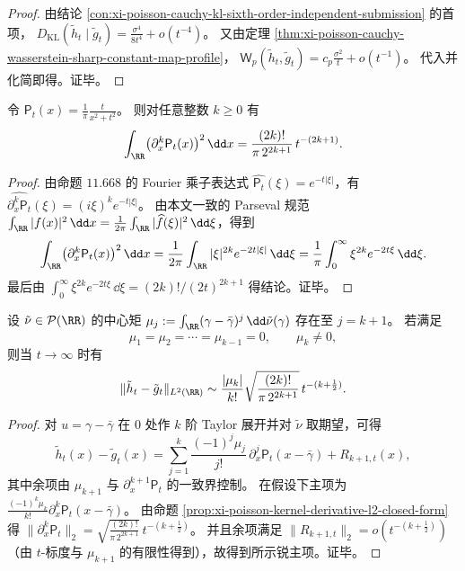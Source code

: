 \begin{proof}
由结论 \ref{con:xi-poisson-cauchy-kl-sixth-order-independent-submission} 的首项，
\(
D_{\mathrm{KL}}(\tilde h_t\mid \tilde g_t)=\frac{\sigma^4}{8t^4}+o(t^{-4})
\)。
又由定理 \ref{thm:xi-poisson-cauchy-wasserstein-sharp-constant-map-profile}，
\(
\mathsf W_p(\tilde h_t,\tilde g_t)=c_p\frac{\sigma^2}{t}+o(t^{-1})
\)。
代入并化简即得。证毕。
\end{proof}

\begin{proposition}\label{prop:xi-poisson-kernel-derivative-l2-closed-form}
令 \(\mathsf P_t(x)=\frac1\pi\frac{t}{x^2+t^2}\)。
则对任意整数 \(k\ge 0\) 有
\[
\int_{\RR}\bigl(\partial_x^k \mathsf P_t(x)\bigr)^2\,\dd x
=\frac{(2k)!}{\pi\,2^{2k+1}}\,t^{-(2k+1)}.
\]
\end{proposition}

\begin{proof}
由命题 \(11.668\) 的 Fourier 乘子表达式 \(\widehat{\mathsf P_t}(\xi)=e^{-t|\xi|}\)，有
\(
\widehat{\partial_x^k\mathsf P_t}(\xi)=(i\xi)^k e^{-t|\xi|}
\)。
由本文一致的 Parseval 规范
\(
\int_{\RR}|f(x)|^2\,\dd x=\frac{1}{2\pi}\int_{\RR}|\widehat f(\xi)|^2\,\dd\xi
\)，得到
\[
\int_{\RR}\bigl(\partial_x^k \mathsf P_t(x)\bigr)^2\,\dd x
=\frac{1}{2\pi}\int_{\RR}|\xi|^{2k}e^{-2t|\xi|}\,\dd\xi
=\frac{1}{\pi}\int_0^\infty \xi^{2k}e^{-2t\xi}\,\dd\xi.
\]
最后由 \(\int_0^\infty \xi^{2k}e^{-2t\xi}\,\dd\xi=(2k)!/(2t)^{2k+1}\) 得结论。证毕。
\end{proof}

\begin{theorem}\label{thm:xi-poisson-cauchy-multipole-l2-leading-term}
设 \(\tilde\nu\in\mathcal P(\RR)\) 的中心矩 \(\mu_j:=\int_{\RR}(\gamma-\bar\gamma)^j\,\dd\tilde\nu(\gamma)\) 存在至 \(j=k+1\)。
若满足
\[
\mu_1=\mu_2=\cdots=\mu_{k-1}=0,
\qquad
\mu_k\neq 0,
\]
则当 \(t\to\infty\) 时有
\[
\|\tilde h_t-\tilde g_t\|_{L^2(\RR)}
\sim
\frac{|\mu_k|}{k!}\sqrt{\frac{(2k)!}{\pi\,2^{2k+1}}}\,t^{-(k+\frac12)}.
\]
\end{theorem}

\begin{proof}
对 \(u=\gamma-\bar\gamma\) 在 \(0\) 处作 \(k\) 阶 Taylor 展开并对 \(\tilde\nu\) 取期望，可得
\[
\tilde h_t(x)-\tilde g_t(x)
=\sum_{j=1}^{k}\frac{(-1)^j\mu_j}{j!}\,\partial_x^j\mathsf P_t(x-\bar\gamma)+R_{k+1,t}(x),
\]
其中余项由 \(\mu_{k+1}\) 与 \(\partial_x^{k+1}\mathsf P_t\) 的一致界控制。
在假设下主项为 \(\frac{(-1)^k\mu_k}{k!}\partial_x^k\mathsf P_t(x-\bar\gamma)\)。
由命题 \ref{prop:xi-poisson-kernel-derivative-l2-closed-form} 得
\(
\|\partial_x^k\mathsf P_t\|_2=\sqrt{\frac{(2k)!}{\pi\,2^{2k+1}}}\,t^{-(k+\frac12)}
\)。
并且余项满足 \(\|R_{k+1,t}\|_2=o(t^{-(k+\frac12)})\)（由 \(t\)-标度与 \(\mu_{k+1}\) 的有限性得到），故得到所示锐主项。证毕。
\end{proof}

